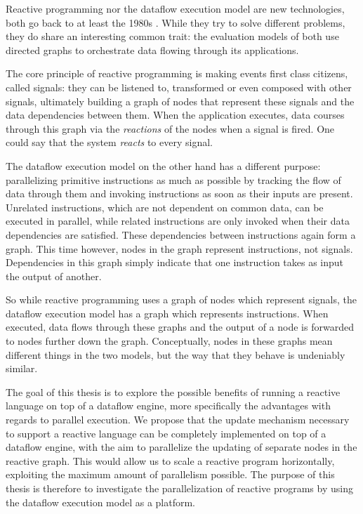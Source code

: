 Reactive programming nor the dataflow execution model are new technologies, both go back to at least the 1980s \cite{harel_development_1985, veen_dataflow_1986}. While they try to solve different problems, they do share an interesting common trait: the evaluation models of both use directed graphs to orchestrate data flowing through its applications. 

The core principle of reactive programming is making events first class citizens, called signals: they can be listened to, transformed or even composed with other signals, ultimately building a graph of nodes that represent these signals and the data dependencies between them. When the application executes, data courses through this graph via the \textit{reactions} of the nodes when a signal is fired. One could say that the system \textit{reacts} to every signal.

The dataflow execution model on the other hand has a different purpose: parallelizing primitive instructions as much as possible by tracking the flow of data through them and invoking instructions as soon as their inputs are present. Unrelated instructions, which are not dependent on common data, can be executed in parallel, while related instructions are only invoked when their data dependencies are satisfied. These dependencies between instructions again form a graph. This time however, nodes in the graph represent instructions, not signals. Dependencies in this graph simply indicate that one instruction takes as input the output of another. 

So while reactive programming uses a graph of nodes which represent signals, the dataflow execution model has a graph which represents instructions. When executed, data flows through these graphs and the output of a node is forwarded to nodes further down the graph. Conceptually, nodes in these graphs mean different things in the two models, but the way that they behave is undeniably similar.

The goal of this thesis is to explore the possible benefits of running a reactive language on top of a dataflow engine, more specifically the advantages with regards to parallel execution. We propose that the update mechanism necessary to support a reactive language can be completely implemented on top of a dataflow engine, with the aim to parallelize the updating of separate nodes in the reactive graph. 
This would allow us to scale a reactive program horizontally, exploiting the maximum amount of parallelism possible. The purpose of this thesis is therefore to investigate the parallelization of reactive programs by using the dataflow execution model as a platform.

